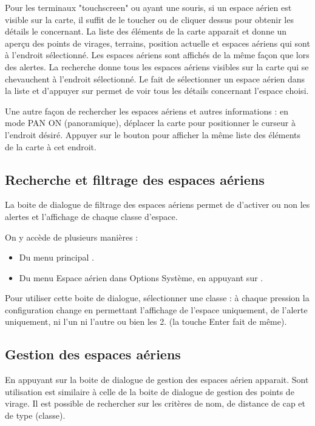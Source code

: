 Pour les terminaux "touchscreen" ou ayant une souris, si un espace aérien est visible sur la carte, il suffit de le toucher ou de cliquer dessus pour obtenir les détails le concernant. La liste des éléments de la carte apparait et donne un aperçu des points de virages, terrains, position actuelle et espaces aériens qui sont à l'endroit sélectionné. Les espaces aériens sont affichés de la même façon que lors des alertes. La recherche donne tous les espaces aériens visibles sur la carte qui se chevauchent à l'endroit sélectionné.
Le fait de sélectionner un espace aérien dans la liste et d'appuyer sur  permet de voir tous les détails concernant l'espace choisi.

\tip Une autre façon de rechercher les espaces aériens et autres informations : en mode PAN ON (panoramique), déplacer la carte pour positionner le curseur à l'endroit désiré.  Appuyer sur le bouton   pour afficher la même liste des éléments de la carte à cet endroit.



\subsection*{Recherche et filtrage des espaces aériens}\label{sec:airspace-filter}

La boite de dialogue de filtrage des espaces aériens permet de d'activer ou non les alertes et l'affichage de chaque classe d'espace.

On y accède de plusieurs manières :
\begin{itemize}
\item Du menu principal \blink{}.
\item Du menu Espace aérien dans Options Système, en appuyant sur .
\end{itemize}

Pour utiliser cette boite de dialogue, sélectionner une classe : à chaque pression la configuration change en permettant l'affichage de l'espace uniquement, de l'alerte uniquement, ni l'un ni l'autre ou bien les 2. (la touche Enter fait de même).

\subsection*{Gestion des espaces aériens}

En appuyant sur  la boite de dialogue de gestion des espaces aérien apparait.  Sont utilisation est similaire à celle de la boite de dialogue de gestion des points de virage. Il est possible de rechercher sur les critères de nom, de distance de cap et de type (classe).

